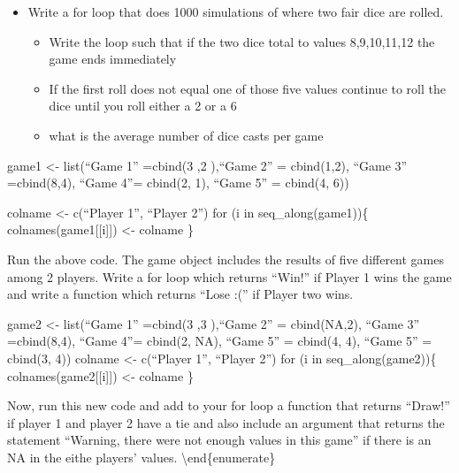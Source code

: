 \documentclass[
]{article}
\begin{document}
\begin{itemize}

\item Write a for loop that does 1000 simulations of where two fair dice are rolled.
\begin{itemize}
\item Write the loop such that if the two dice total to values 8,9,10,11,12 the game ends immediately
\item If the first roll does not equal one of those five values continue to roll the dice until you roll either a 2 or a 6
\item what is the average number of dice casts per game
\end{itemize}\end{itemize}

\item

game1 \textless- list(``Game 1'' =cbind(3 ,2 ),``Game 2'' = cbind(1,2),
``Game 3'' =cbind(8,4), ``Game 4''= cbind(2, 1), ``Game 5'' = cbind(4,
6))

colname \textless- c(``Player 1'', ``Player 2'') for (i in
seq\_along(game1))\{ colnames(game1{[}{[}i{]}{]}) \textless- colname \}

Run the above code. The game object includes the results of five
different games among 2 players. Write a for loop which returns ``Win!''
if Player 1 wins the game and write a function which returns ``Lose :(''
if Player two wins.

game2 \textless- list(``Game 1'' =cbind(3 ,3 ),``Game 2'' = cbind(NA,2),
``Game 3'' =cbind(8,4), ``Game 4''= cbind(2, NA), ``Game 5'' = cbind(4,
4), ``Game 5'' = cbind(3, 4)) colname \textless- c(``Player 1'',
``Player 2'') for (i in seq\_along(game2))\{
colnames(game2{[}{[}i{]}{]}) \textless- colname \}

Now, run this new code and add to your for loop a function that returns
``Draw!'' if player 1 and player 2 have a tie and also include an
argument that returns the statement ``Warning, there were not enough
values in this game'' if there is an NA in the eithe players' values.
\textbackslash end\{enumerate\}
\end{document}
